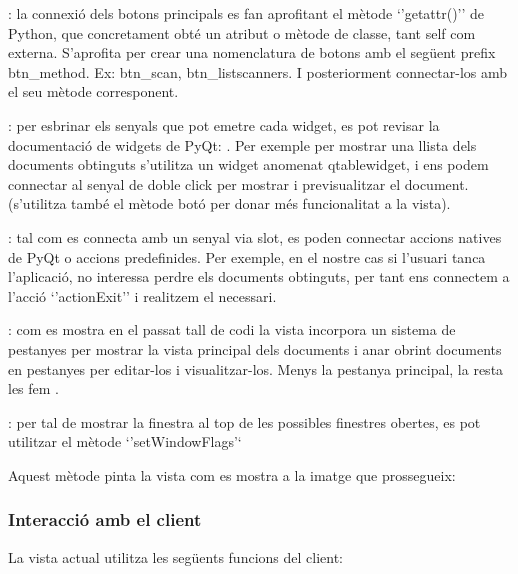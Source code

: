 \documentclass[letterpaper,11pt,catalan]{sphinxmanual}
\begin{document}
: la connexió dels botons principals es fan aprofitant el mètode `'getattr()'' de Python, que
concretament obté un atribut o mètode de classe, tant self com externa. S'aprofita per crear una
nomenclatura de botons amb el següent prefix btn\_method. Ex: btn\_scan, btn\_listscanners. I posteriorment
connectar-los amb el seu mètode corresponent.

: per esbrinar els senyals que pot emetre cada widget, es pot revisar la
documentació de widgets de PyQt: .
Per exemple per mostrar una llista dels documents obtinguts s'utilitza un widget
anomenat qtablewidget, i ens podem connectar al senyal de doble click per mostrar
i previsualitzar el document. (s'utilitza també el mètode botó per donar més funcionalitat
a la vista).

: tal com es connecta amb un senyal via slot, es poden connectar accions natives
de PyQt o accions predefinides. Per exemple, en el nostre cas si l'usuari tanca l'aplicació,
no interessa perdre els documents obtinguts, per tant ens connectem a l'acció `'actionExit'' i realitzem
el necessari.

: com es mostra en el passat tall de codi la vista incorpora un sistema de pestanyes
per mostrar la vista principal dels documents i anar obrint documents en pestanyes per editar-los
i visualitzar-los. Menys la pestanya principal, la resta les fem .

: per tal de mostrar la finestra al top de les possibles finestres obertes,
es pot utilitzar el mètode `'setWindowFlags'`

Aquest mètode pinta la vista com es mostra a la imatge que prossegueix:

\begin{DUlineblock}{0em}
\item[] 
\end{DUlineblock}



\subsubsection{Interacció amb el client}
\label{\detokenize{index:interaccio-amb-el-client}}
La vista actual utilitza les següents funcions del client:
\end{document}
